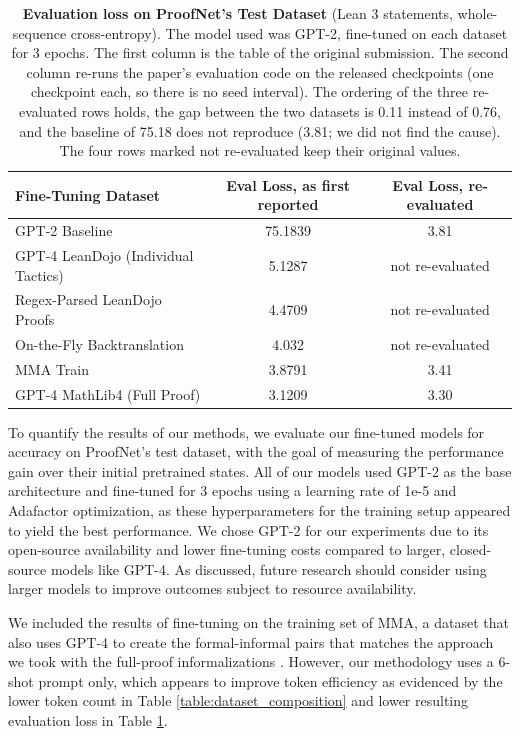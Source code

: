 \documentclass{article} %
\begin{document}
\begin{table}[ht]
\centering
\begin{tabular}{|l|c|c|}
\hline
\textbf{Fine-Tuning Dataset} & \textbf{Eval Loss, as first reported} & \textbf{Eval Loss, re-evaluated} \\
\hline
GPT-2 Baseline & 75.1839 & 3.81 \\
\hline
GPT-4 LeanDojo (Individual Tactics) & 5.1287 & not re-evaluated \\
\hline
Regex-Parsed LeanDojo Proofs & 4.4709 & not re-evaluated \\
\hline
On-the-Fly Backtranslation & 4.032 & not re-evaluated \\
\hline
MMA Train & 3.8791 & 3.41 \\
\hline
GPT-4 MathLib4 (Full Proof)& 3.1209 & 3.30 \\
\hline
\end{tabular}
\caption{\textbf{Evaluation loss on ProofNet's Test Dataset} (Lean 3 statements, whole-sequence cross-entropy). The model used was GPT-2, fine-tuned on each dataset for 3 epochs. The first column is the table of the original submission. The second column re-runs the paper's evaluation code on the released checkpoints (one checkpoint each, so there is no seed interval). The ordering of the three re-evaluated rows holds, the gap between the two datasets is 0.11 instead of 0.76, and the baseline of 75.18 does not reproduce (3.81; we did not find the cause). The four rows marked not re-evaluated keep their original values.}
\label{table:model_loss}
\end{table}

To quantify the results of our methods, we evaluate our fine-tuned models for accuracy on ProofNet's test dataset, with the goal of measuring the performance gain over their initial pretrained states. All of our models used GPT-2 as the base architecture and fine-tuned for 3 epochs using a learning rate of 1e-5 and Adafactor optimization, as these hyperparameters for the training setup appeared to yield the best performance. We chose GPT-2 for our experiments due to its open-source availability and lower fine-tuning costs compared to larger, closed-source models like GPT-4. As discussed, future research should consider using larger models to improve outcomes subject to resource availability.

We included the results of fine-tuning on the training set of MMA, a dataset that also uses GPT-4 to create the formal-informal pairs that matches the approach we took with the full-proof informalizations \citep{mma}. However, our methodology uses a 6-shot prompt only, which appears to improve token efficiency as evidenced by the lower token count in Table \ref{table:dataset_composition} and lower resulting evaluation loss in Table \ref{table:model_loss}.
\end{document}

